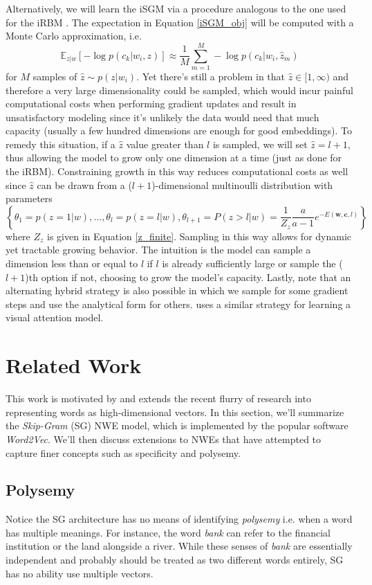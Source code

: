 \documentclass{article} %
\begin{document}
Alternatively, we will learn the iSGM via a procedure analogous to the one used for the iRBM \citep{cote2015infinite}.  The expectation in Equation \ref{iSGM_obj} will be computed with a Monte Carlo approximation, i.e. $$\mathbb{E}_{z|w}[- \log p( c_{k}| w_{i}, z)] \approx \frac{1}{M} \sum_{m=1}^{M}  - \log p( c_{k}| w_{i}, \hat z_{m}) $$ for $M$ samples of $\hat z \sim p(z|w_{i})$.  Yet there's still a problem in that $\hat z \in [1, \infty)$ and therefore a very large dimensionality could be sampled, which would incur painful computational costs when performing gradient updates and result in unsatisfactory modeling since it's unlikely the data would need that much capacity (usually a few hundred dimensions are enough for good embeddings).  To remedy this situation, if a $\hat z$ value greater than $l$ is sampled, we will set $\hat z = l + 1$, thus allowing the model to grow only one dimension at a time (just as done for the iRBM).  Constraining growth in this way reduces computational costs as well since $\hat z$ can be drawn from a ($l+1$)-dimensional multinoulli distribution with parameters $$\left \{\theta_{1}=p(z=1|w),\ldots, \theta_{l}=p(z=l|w), \theta_{l+1}=P(z>l|w)=\frac{1}{Z_{z}}\frac{a}{a-1}e^{-E(\mathbf{w}, \mathbf{c}, l)} \right \}$$ where $Z_{z}$ is given in Equation \ref{z_finite}.  Sampling in this way allows for dynamic yet tractable growing behavior.  The intuition is the model can sample a dimension less than or equal to $l$ if $l$ is already sufficiently large or sample the ($l+1$)th option if not, choosing to grow the model's capacity.  Lastly, note that an alternating hybrid strategy is also possible in which we sample for some gradient steps and use the analytical form for others.  \cite{xu2015show} uses a similar strategy for learning a visual attention model.  

\section{Related Work}
This work is motivated by and extends the recent flurry of research into representing words as high-dimensional vectors.  In this section, we'll summarize the \textit{Skip-Gram} (SG) NWE model, which is implemented by the popular software \textit{Word2Vec}.  We'll then discuss extensions to NWEs that have attempted to capture finer concepts such as specificity and polysemy.

\subsection{Polysemy}
Notice the SG architecture has no means of identifying \textit{polysemy} i.e. when a word has multiple meanings.  For instance, the word \textit{bank} can refer to the financial institution or the land alongside a river.  While these senses of \textit{bank} are essentially independent and probably should be treated as two different words entirely, SG has no ability use multiple vectors.  
\end{document}
